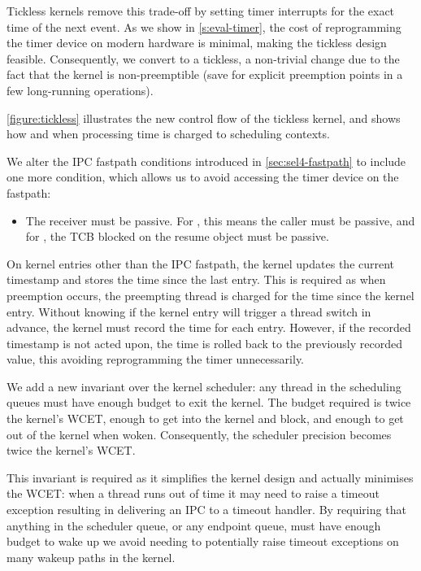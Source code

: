 Tickless kernels remove this trade-off by setting timer interrupts for the exact time of the next
event. As we show in \cref{s:eval-timer}, the cost of reprogramming the timer device on modern
hardware is minimal, making the tickless design feasible. Consequently, we convert \selfour
to a tickless, a non-trivial change due to the fact that the kernel is non-preemptible (save for
explicit preemption points in a few long-running operations). 

\cref{figure:tickless} illustrates the new control flow of the tickless kernel, and shows
how and when processing time is charged to scheduling contexts.

We alter the IPC fastpath conditions introduced in \cref{sec:sel4-fastpath} to include one
more condition, which allows us to avoid accessing the timer device on the fastpath:
\begin{itemize}
    \item The receiver must be passive. For \call, this means the caller must be passive, and
          for \replyrecv, the TCB blocked on the resume object must be passive.
\end{itemize}

On kernel entries other than the IPC fastpath, the kernel updates the current
timestamp and stores the time since the last entry. This is required as when preemption occurs, the
preempting thread is charged for the time since the kernel entry. Without knowing if the kernel entry will
trigger a thread switch in advance, the kernel must record the time for each entry. However, if the
recorded timestamp is not acted upon, the time is rolled back to the previously recorded value,
this avoiding reprogramming the timer unnecessarily.

We add a new invariant over the kernel scheduler: any thread in the 
scheduling queues must have enough budget to exit the kernel. The budget required is twice the
kernel's WCET, enough to get into the kernel and block, and enough to get out of the kernel 
when woken. 
Consequently, the scheduler precision becomes twice the kernel's WCET.

This invariant is required as it simplifies the kernel design and actually minimises the WCET: when
a
thread runs out of time it may need to raise a timeout exception resulting in delivering an IPC to a
timeout handler. By requiring that anything in the scheduler queue, or any endpoint queue, must have
enough budget to wake up we avoid needing to potentially raise timeout exceptions on many wakeup
paths in the kernel.

